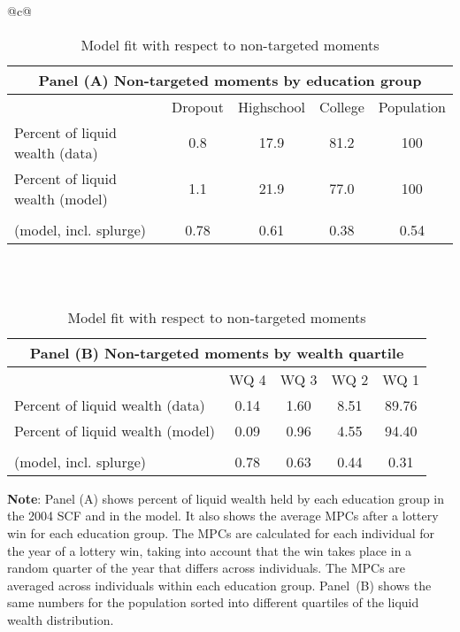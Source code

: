 \documentclass[\econtexRoot/HAFiscal]{subfiles}
\begin{document}
\begin{table}[th]
    \centering
    \begin{tabular*}{\textwidth}{@{\extracolsep{\fill}}c@{}}
        \begin{tabular}{lcccc}
            \multicolumn{5}{c}{Panel (A) Non-targeted moments by education group} \\ \midrule
            & Dropout & Highschool & College & Population \\ \midrule
            Percent of liquid wealth (data) & 0.8 & 17.9 & 81.2 & 100 \\
            Percent of liquid wealth (model) & 1.1 & 21.9 & 77.0 & 100 \\
            \makecell[l]{Avg. lottery-win-year MPC \\ (model, incl. splurge)} & 0.78 & 0.61 & 0.38 & 0.54
            \\ \bottomrule 
        \end{tabular} \\ \\

      \vspace{2em}
      
        \begin{tabular}{lcccc}
            \multicolumn{5}{c}{Panel (B) Non-targeted moments by wealth quartile} \\ \midrule
             & WQ 4 & WQ 3 & WQ 2 & WQ 1 \\ \midrule
            Percent of liquid wealth (data) & 0.14 & 1.60 & 8.51 & 89.76 \\
            Percent of liquid wealth (model) & 0.09 & 0.96 & 4.55 & 94.40 \\
            \makecell[l]{Avg. lottery-win-year MPC \\ (model, incl. splurge)} & 0.78 & 0.63 & 0.44 & 0.31
            \\ \bottomrule 
        \end{tabular}
    \end{tabular*}
    \caption{Model fit with respect to non-targeted moments}
    \notinsubfile{\label{tab:nonTargetedMoments}}
    \parbox{16cm}{\small \vspace{.15cm} \textbf{Note}: Panel (A) shows percent of liquid wealth held by each education group in the 2004 SCF and in the model.
It also shows the average MPCs after a lottery win for each education group.
The MPCs are calculated for each individual for the year of a lottery win, taking into account that the win takes place in a random quarter of the year that differs across individuals.
The MPCs are averaged across individuals within each education group.
Panel~(B) shows the same numbers for the population sorted into different quartiles of the liquid wealth distribution.\normalsize}
  \end{table}
  
\end{document}
